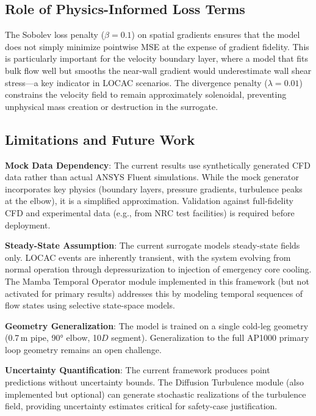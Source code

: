 \documentclass[conference]{IEEEtran}
\begin{document}
\subsection{Role of Physics-Informed Loss Terms}

The Sobolev loss penalty ($\beta = 0.1$) on spatial gradients ensures that the model does not simply minimize pointwise MSE at the expense of gradient fidelity. This is particularly important for the velocity boundary layer, where a model that fits bulk flow well but smooths the near-wall gradient would underestimate wall shear stress—a key indicator in LOCAC scenarios. The divergence penalty ($\lambda = 0.01$) constrains the velocity field to remain approximately solenoidal, preventing unphysical mass creation or destruction in the surrogate.

\subsection{Limitations and Future Work}

\textbf{Mock Data Dependency}: The current results use synthetically generated CFD data rather than actual ANSYS Fluent simulations. While the mock generator incorporates key physics (boundary layers, pressure gradients, turbulence peaks at the elbow), it is a simplified approximation. Validation against full-fidelity CFD and experimental data (e.g., from NRC test facilities) is required before deployment.

\textbf{Steady-State Assumption}: The current surrogate models steady-state fields only. LOCAC events are inherently transient, with the system evolving from normal operation through depressurization to injection of emergency core cooling. The Mamba Temporal Operator module implemented in this framework (but not activated for primary results) addresses this by modeling temporal sequences of flow states using selective state-space models.

\textbf{Geometry Generalization}: The model is trained on a single cold-leg geometry (0.7\,m pipe, 90° elbow, 10$D$ segment). Generalization to the full AP1000 primary loop geometry remains an open challenge.

\textbf{Uncertainty Quantification}: The current framework produces point predictions without uncertainty bounds. The Diffusion Turbulence module (also implemented but optional) can generate stochastic realizations of the turbulence field, providing uncertainty estimates critical for safety-case justification.
\end{document}
